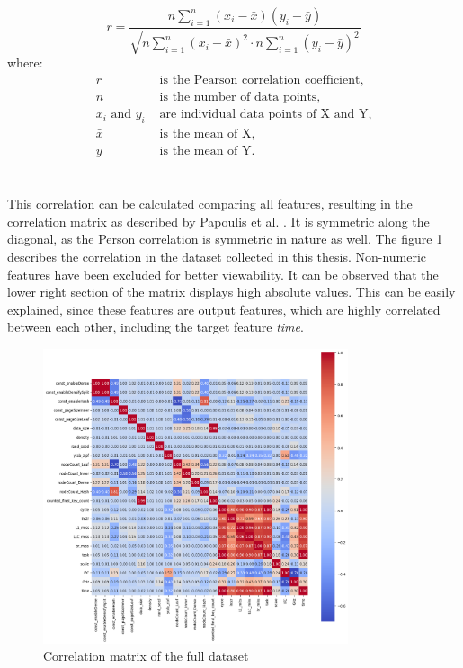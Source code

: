\begin{equation} \label{correlationformula}
r = \frac{n\sum_{i=1}^{n} (x_i - \bar{x})(y_i - \bar{y})}{\sqrt{n\sum_{i=1}^{n} (x_i - \bar{x})^2 \cdot n\sum_{i=1}^{n} (y_i - \bar{y})^2}}
\end{equation}
where:
\begin{align*}
r & \text{ is the Pearson correlation coefficient}, \\
n & \text{ is the number of data points}, \\
x_i \text{ and } y_i & \text{ are individual data points of X and Y}, \\
\bar{x} & \text{ is the mean of X}, \\
\bar{y} & \text{ is the mean of Y}.
\end{align*}
\\\\
This correlation can be calculated comparing all features, resulting in the correlation matrix as described by Papoulis et al. \parencite{papoulis2002probability}. It is symmetric along the diagonal, as the Person correlation is symmetric in nature as well. The figure \ref{fig:cormatrix} describes the correlation in the dataset collected in this thesis. Non-numeric features have been excluded for better viewability. It can be observed that the lower right section of the matrix displays high absolute values. This can be easily explained, since these features are output features, which are highly correlated between each other, including the target feature \textit{time}. 
\begin{figure}[h]
  \centering
  \includegraphics[width=0.8\textwidth]{images/correlation_matrix.png}
  \caption{Correlation matrix of the full dataset}
  \label{fig:cormatrix}
\end{figure} 

